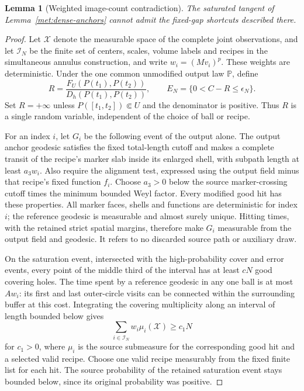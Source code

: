 \documentclass[11pt]{article}
\numberwithin{equation}{section}
\newtheorem{lemma}[theorem]{Lemma}
\theoremstyle{definition}
\theoremstyle{remark}
\newcommand{\1}{\mathbf 1}
\begin{document}
\begin{lemma}[Weighted image-count contradiction]
\label{met:weighted-count}
The saturated tangent of Lemma~\ref{met:dense-anchors} cannot admit
the fixed-gap shortcuts described there.
\end{lemma}

\begin{proof}
Let $\mathcal X$ denote the measurable space of the complete joint
observations, and let $\mathcal I_N$ be the finite set of centers, scales, volume
labels and recipes in the simultaneous annulus construction, and
write $w_i=(Mv_i)^p$.  These weights are deterministic.  Under the
one common unmodified output law $\mathbb P$, define
\[
 R=\frac{F_U(P(t_1),P(t_2))}{D_h(P(t_1),P(t_2))},
 \qquad E_N=\{0<C-R\leq\epsilon_N\}.
\]
Set $R=+\infty$ unless $P([t_1,t_2])\Subset U$ and the denominator
is positive.  Thus $R$ is a single random variable, independent of
the choice of ball or recipe.

For an index $i$, let $G_i$ be the following event of the output
alone.  The output anchor geodesic satisfies the fixed total-length
cutoff and makes a complete transit of the recipe's marker slab
inside its enlarged shell, with subpath length at least $a_3w_i$.
Also require the alignment test, expressed using the output field
minus that recipe's fixed function $f_i$.  Choose $a_3>0$ below the
source marker-crossing cutoff times the minimum bounded Weyl factor.
Every modified good hit has these properties.  All marker faces,
shells and functions are deterministic for index $i$; the reference
geodesic is measurable and almost surely unique.  Hitting times,
with the retained strict spatial margins, therefore make $G_i$
measurable from the output field and geodesic.  It refers to no
discarded source path or auxiliary draw.

On the saturation event, intersected with the high-probability cover and
error events, every point of the middle third of the interval has
at least $cN$ good covering holes.  The time spent by a reference
geodesic in any one ball is at most $Aw_i$: its first and last
outer-circle visits can be connected within the surrounding buffer at this
cost.  Integrating the covering multiplicity along an interval of
length bounded below gives
\begin{equation}
 \sum_{i\in\mathcal I_N}w_i\mu_i(\mathcal X)\geq c_1N
 \label{met:source-weight}
\end{equation}
for $c_1>0$, where $\mu_i$ is the source submeasure for the
corresponding good hit and a selected valid recipe.  Choose one
valid recipe measurably from the fixed finite list for each hit.
The source probability of the retained saturation event stays
bounded below, since its original probability was positive.


\end{proof}
\end{document}
